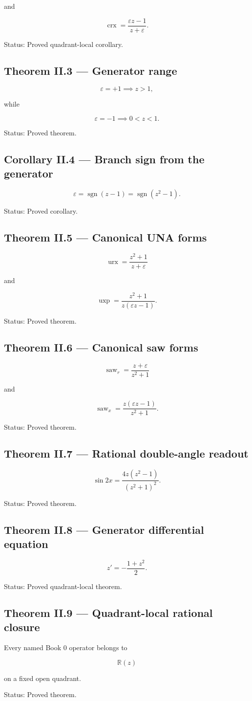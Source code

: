 \documentclass[11pt,oneside,openany]{book}
\newcommand{\PCsubsection}[1]{%
  \subsection*{#1}%
}
\begin{document}
and

\[
\operatorname{crx} = \frac{\varepsilon z-1}{z+\varepsilon}.
\]

Status: Proved quadrant-local corollary.

\PCsubsection{Theorem II.3 --- Generator range}

\[
\varepsilon=+1 \implies z>1,
\]

while

\[
\varepsilon=-1 \implies 0<z<1.
\]

Status: Proved theorem.

\PCsubsection{Corollary II.4 --- Branch sign from the generator}

\[
\boxed{ \varepsilon = \operatorname{sgn}(z-1) = \operatorname{sgn}(z^2-1). }
\]

Status: Proved corollary.

\PCsubsection{Theorem II.5 --- Canonical UNA forms}

\[
\boxed{ \operatorname{urx} = \frac{z^2+1}{z+\varepsilon} }
\]

and

\[
\boxed{ \operatorname{uxp} = \frac{z^2+1} {z(\varepsilon z-1)}. }
\]

Status: Proved theorem.

\PCsubsection{Theorem II.6 --- Canonical saw forms}

\[
\boxed{ \operatorname{saw}_{r} = \frac{z+\varepsilon}{z^2+1} }
\]

and

\[
\boxed{ \operatorname{saw}_{x} = \frac{z(\varepsilon z-1)}{z^2+1}. }
\]

Status: Proved theorem.

\PCsubsection{Theorem II.7 --- Rational double-angle readout}

\[
\boxed{ \sin 2x = \frac{4z(z^2-1)} {(z^2+1)^2}. }
\]

Status: Proved theorem.

\PCsubsection{Theorem II.8 --- Generator differential equation}

\[
\boxed{ z' = -\frac{1+z^2}{2}. }
\]

Status: Proved quadrant-local theorem.

\PCsubsection{Theorem II.9 --- Quadrant-local rational closure}

Every named Book 0 operator belongs to

\[
\boxed{ \mathbb R(z) }
\]

on a fixed open quadrant.

Status: Proved theorem.
\end{document}
